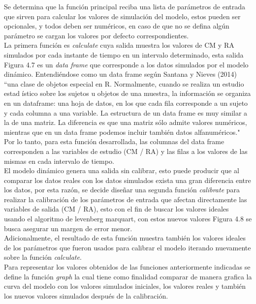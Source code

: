 Se determina que la funci\'on principal reciba una lista de par\'ametros de entrada que sirven para calcular los valores de simulaci\'on del modelo, estos pueden ser opcionales, y todos deben ser num\'ericos, en caso de que no se defina alg\'un par\'ametro se cargan los valores por defecto correspondientes.\\

La primera funci\'on es \textit{calculate} cuya salida muestra los valores de CM y RA simulados por cada instante de tiempo en un intervalo determinado, esta salida Figura 4.7 es un \textit{data frame} que corresponde a los datos simulados por el modelo din\'amico. Entendi\'endose como un data frame seg\'un Santana y Nieves (2014) “una clase de objetos especial en R. Normalmente, cuando se realiza un estudio estad \'istico sobre los sujetos u objetos de una muestra, la informaci\'on se organiza en un dataframe: una hoja de datos, en los que cada fila corresponde a un sujeto y cada columna a una variable. La estructura de un data frame es muy similar a la de una matriz. La diferencia es que una matriz s\'olo admite valores num\'ericos, mientras que en un data frame podemos incluir tambi\'en datos alfanum\'ericos."\\

Por lo tanto, para esta funci\'on desarrollada, las columnas del data frame corresponden a las variables de estudio (CM / RA) y las filas a los valores de las mismas en cada intervalo de tiempo.\\

El modelo din\'amico genera una salida sin calibrar, esto puede producir que al comparar los datos reales con los datos simulados exista una gran diferencia entre los datos, por esta raz\'on, se decide diseñar una segunda funci\'on \textit{calibrate} para realizar la calibraci\'on de los par\'ametros de entrada que afectan directamente las variables de salida (CM / RA), esto con el fin de buscar los valores ideales usando el algoritmo de levenberg marquart, con estos nuevos valores Figura 4.8 se busca asegurar un margen de error menor.\\

Adicionalmente, el resultado de esta funci\'on muestra tambi\'en los valores ideales de los par\'ametros que fueron usados para calibrar el modelo iterando nuevamente sobre la funci\'on \textit{calculate}.\\

Para representar los valores obtenidos de las funciones anteriormente indicadas se define la funci\'on \textit{graph} la cual tiene como finalidad comparar de manera grafica la curva del modelo con los valores simulados iniciales, los valores reales y tambi\'en los nuevos valores simulados despu\'es de la calibraci\'on.\\

